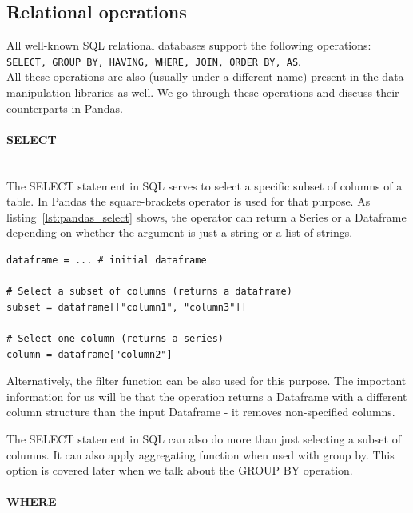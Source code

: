 \subsection{Relational operations}

All well-known SQL relational databases support the following operations:
\texttt{SELECT, GROUP BY, HAVING, WHERE, JOIN, ORDER BY, AS}.
\\All these operations are also (usually under a different name) present in the data manipulation libraries as well.
We go through these operations and discuss their counterparts in Pandas.

\paragraph{SELECT} \leavevmode \\

The SELECT statement in SQL serves to select a specific subset of columns of a table.
In Pandas the square-brackets operator is used for that purpose.
As listing~\ref{lst:pandas_select} shows, the operator can return a Series or a Dataframe depending on whether
the argument is just a string or a list of strings.

\begin{lstlisting}[caption=Select in Pandas, label={lst:pandas_select}, captionpos=b]
dataframe = ... # initial dataframe

# Select a subset of columns (returns a dataframe)
subset = dataframe[["column1", "column3"]]

# Select one column (returns a series)
column = dataframe["column2"]
\end{lstlisting}

Alternatively, the filter function can be also used for this purpose.
The important information for us will be that the operation returns a Dataframe with a different column structure
than the input Dataframe - it removes non-specified columns.

The SELECT statement in SQL can also do more than just selecting a subset of columns.
It can also apply aggregating function when used with group by.
This option is covered later when we talk about the GROUP BY operation.

\paragraph{WHERE} \leavevmode \\

